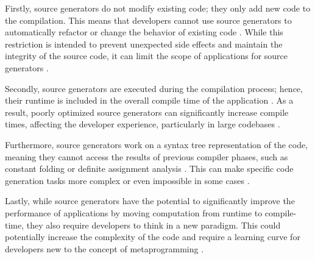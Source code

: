 Firstly, source generators do not modify existing code; they only add new code to the compilation. This means that developers cannot use source generators to automatically refactor or change the behavior of existing code \cite{CSharpRoslyn}. While this restriction is intended to prevent unexpected side effects and maintain the integrity of the source code, it can limit the scope of applications for source generators \cite{Carter2020}.

Secondly, source generators are executed during the compilation process; hence, their runtime is included in the overall compile time of the application \cite{CSharpRoslyn}. As a result, poorly optimized source generators can significantly increase compile times, affecting the developer experience, particularly in large codebases \cite{Carter2020}.

Furthermore, source generators work on a syntax tree representation of the code, meaning they cannot access the results of previous compiler phases, such as constant folding or definite assignment analysis \cite{Torgersen2020}. This can make specific code generation tasks more complex or even impossible in some cases \cite{CSharpRoslyn}.

Lastly, while source generators have the potential to significantly improve the performance of applications by moving computation from runtime to compile-time, they also require developers to think in a new paradigm. This could potentially increase the complexity of the code and require a learning curve for developers new to the concept of metaprogramming \cite{CSharpRoslyn}.
